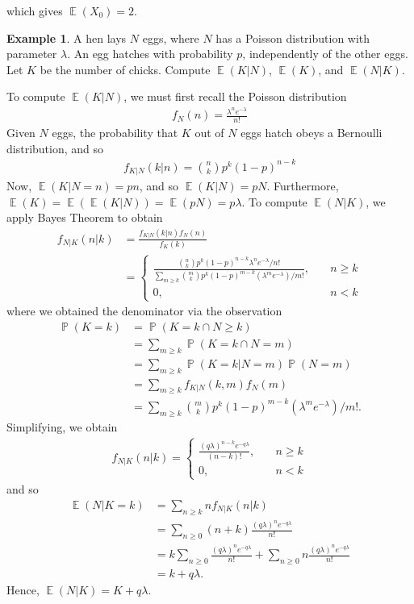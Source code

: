 \documentclass[12pt]{article}
\DeclareMathOperator{\ex}{\mathbb{E}}
\DeclareMathOperator{\prob}{\mathbb{P}}
\theoremstyle{plain}
\theoremstyle{definition}
\newtheorem*{example}{Example}
\theoremstyle{remark}
\numberwithin{equation}{section}  %
\begin{document}
which gives $\ex(X_0) = 2$.
\begin{example}
	A hen lays $N$ eggs, where $N$ has a Poisson distribution with parameter
	$\lambda$. An egg hatches with probability $p$, independently  of the other
	eggs. Let $K$ be the number of chicks. Compute $\ex(K|N)$, $\ex(K)$, and $\ex(N | 
	K)$.
\end{example}
To compute $\ex(K|N)$, we must first recall the Poisson distribution
\begin{align*}
	f_N(n) = \frac{\lambda^n e^{-\lambda}}{n!}
\end{align*}
Given $N$ eggs, the probability that $K$ out of $N$ eggs hatch obeys a 
Bernoulli distribution, and so 
\begin{align*}
	f_{K|N}(k|n) = \binom{n}{k} p^k {(1-p)}^{n-k}
\end{align*}
Now, $\ex(K | N = n) = pn$, and so $\ex(K | N) = pN$. Furthermore, $\ex(K) = \ex(\ex(K
| N	)) = \ex(pN) = p \lambda$.
To compute $\ex(N | K)$, we apply Bayes Theorem to obtain
\begin{align*}
	f_{N|K}(n|k) & = \frac{f_{K|N}(k|n)f_N(n)}{f_K(k)}
	\\
	& = \begin{cases}
		\frac{\binom{n}{k}p^k {(1-p)}^{n-k} \lambda^n
		e^{-\lambda}/n!}{\sum_{m \ge k}
		\binom{m}{k} p^k {(1 - p)}^{m-k} (\lambda^m e^{-\lambda})/m!}
		, \quad & n \ge k
		\\
		0, \quad & n<k
	\end{cases}
\end{align*}
where we obtained the denominator via the observation
\begin{align*}
	\prob(K = k) & = \prob(K = k \cap N \ge k) 
	\\
	& = \sum_{m \ge k} \prob(K =
	k \cap N = m) 
	\\
	& = \sum_{m \ge k} \prob(K = k | N = m) \prob(N = m)
	\\
	& = \sum_{m \ge k} f_{K|N}(k, m) f_N(m)
	\\
	& = \sum_{m \ge k}
	\binom{m}{k} p^k {(1 - p)}^{m-k} (\lambda^m e^{-\lambda})/m!.
\end{align*}
Simplifying, we obtain
\begin{align*}
	f_{N|K}(n|k) = 
	\begin{cases}
		\frac{{(q\lambda)}^{n-k} e^{-q\lambda}}{(n-k)!}, \quad & n \ge k
		\\
		0, \quad & n<k
	\end{cases}
\end{align*}
and so 
\begin{align*}
	\ex(N | K = k) & = \sum_{n \ge k} n f_{N|K}(n | k)
	\\
	& = \sum_{n \ge 0} (n + k) \frac{{(q \lambda)}^n e^{-q\lambda}}{n!}
	\\
	& = k \sum_{n \ge 0} \frac{{(q \lambda)}^n e^{-q\lambda}}{n!} + \sum_{n \ge 
	0}
	n \frac{{(q\lambda)}^n e^{-q\lambda}}{n!} 
	\\
	& = k + q\lambda.
\end{align*}
Hence, $\ex(N|K) = K + q \lambda$.
\end{document}
